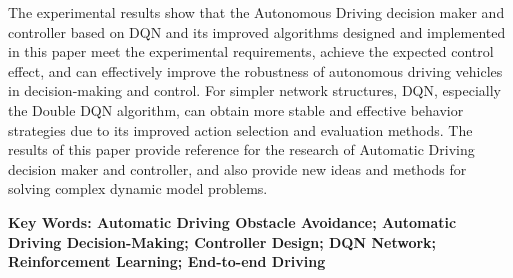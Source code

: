 The experimental results show that the Autonomous Driving decision maker and controller based on DQN and its improved algorithms designed and implemented in this paper meet the experimental requirements, achieve the expected control effect, and can effectively improve the robustness of autonomous driving vehicles in decision-making and control. For simpler network structures, DQN, especially the Double DQN algorithm, can obtain more stable and effective behavior strategies due to its improved action selection and evaluation methods. The results of this paper provide reference for the research of Automatic Driving decision maker and controller, and also provide new ideas and methods for solving complex dynamic model problems.

\vspace{3ex}\noindent\textbf{Key Words: Automatic Driving Obstacle Avoidance; Automatic Driving Decision-Making; Controller Design; DQN Network; Reinforcement Learning; End-to-end Driving}
\newpage
